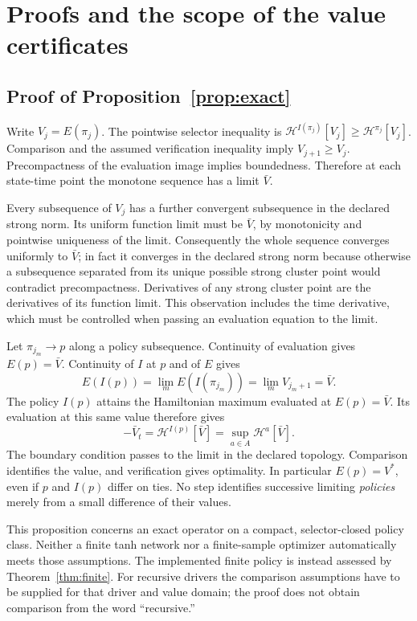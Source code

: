 \section{Proofs and the scope of the value certificates}
\label{app:proofs}
\subsection{Proof of Proposition~\ref{prop:exact}}
Write $V_j=E(\pi_j)$. The pointwise selector inequality is
$\mathcal H^{I(\pi_j)}[V_j]\geq\mathcal H^{\pi_j}[V_j]$. Comparison and the assumed verification inequality imply $V_{j+1}\geq V_j$. Precompactness of the evaluation image implies boundedness. Therefore at each state-time point the monotone sequence has a limit $\bar V$.

Every subsequence of $V_j$ has a further convergent subsequence in the declared strong norm. Its uniform function limit must be $\bar V$, by monotonicity and pointwise uniqueness of the limit. Consequently the whole sequence converges uniformly to $\bar V$; in fact it converges in the declared strong norm because otherwise a subsequence separated from its unique possible strong cluster point would contradict precompactness. Derivatives of any strong cluster point are the derivatives of its function limit. This observation includes the time derivative, which must be controlled when passing an evaluation equation to the limit.

Let $\pi_{j_m}\to p$ along a policy subsequence. Continuity of evaluation gives $E(p)=\bar V$. Continuity of $I$ at $p$ and of $E$ gives
\[
E(I(p))=\lim_m E(I(\pi_{j_m}))=\lim_m V_{j_m+1}=\bar V.
\]
The policy $I(p)$ attains the Hamiltonian maximum evaluated at $E(p)=\bar V$. Its evaluation at this same value therefore gives
\[
-\bar V_t=\mathcal H^{I(p)}[\bar V]=\sup_{a\in A}\mathcal H^a[\bar V].
\]
The boundary condition passes to the limit in the declared topology. Comparison identifies the value, and verification gives optimality. In particular $E(p)=V^*$, even if $p$ and $I(p)$ differ on ties. No step identifies successive limiting \emph{policies} merely from a small difference of their values.

This proposition concerns an exact operator on a compact, selector-closed policy class. Neither a finite tanh network nor a finite-sample optimizer automatically meets those assumptions. The implemented finite policy is instead assessed by Theorem~\ref{thm:finite}. For recursive drivers the comparison assumptions have to be supplied for that driver and value domain; the proof does not obtain comparison from the word ``recursive.''


